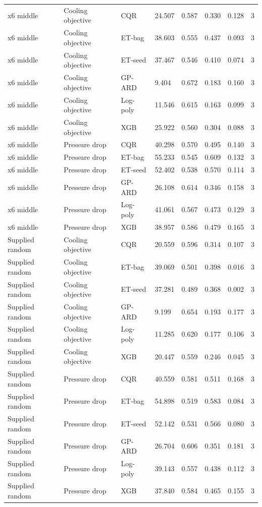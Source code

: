 \begin{longtable}{llllllll}
x6 middle & Cooling objective & CQR & 24.507 & 0.587 & 0.330 & 0.128 & 3\\
x6 middle & Cooling objective & ET-bag & 38.603 & 0.555 & 0.437 & 0.093 & 3\\
x6 middle & Cooling objective & ET-seed & 37.467 & 0.546 & 0.410 & 0.074 & 3\\
x6 middle & Cooling objective & GP-ARD & 9.404 & 0.672 & 0.183 & 0.160 & 3\\
x6 middle & Cooling objective & Log-poly & 11.546 & 0.615 & 0.163 & 0.099 & 3\\
x6 middle & Cooling objective & XGB & 25.922 & 0.560 & 0.304 & 0.088 & 3\\
x6 middle & Pressure drop & CQR & 40.298 & 0.570 & 0.495 & 0.140 & 3\\
x6 middle & Pressure drop & ET-bag & 55.233 & 0.545 & 0.609 & 0.132 & 3\\
x6 middle & Pressure drop & ET-seed & 52.402 & 0.538 & 0.570 & 0.114 & 3\\
x6 middle & Pressure drop & GP-ARD & 26.108 & 0.614 & 0.346 & 0.158 & 3\\
x6 middle & Pressure drop & Log-poly & 41.061 & 0.567 & 0.473 & 0.129 & 3\\
x6 middle & Pressure drop & XGB & 38.957 & 0.586 & 0.479 & 0.165 & 3\\
Supplied random & Cooling objective & CQR & 20.559 & 0.596 & 0.314 & 0.107 & 3\\
Supplied random & Cooling objective & ET-bag & 39.069 & 0.501 & 0.398 & 0.016 & 3\\
Supplied random & Cooling objective & ET-seed & 37.281 & 0.489 & 0.368 & 0.002 & 3\\
Supplied random & Cooling objective & GP-ARD & 9.199 & 0.654 & 0.193 & 0.177 & 3\\
Supplied random & Cooling objective & Log-poly & 11.285 & 0.620 & 0.177 & 0.106 & 3\\
Supplied random & Cooling objective & XGB & 20.447 & 0.559 & 0.246 & 0.045 & 3\\
Supplied random & Pressure drop & CQR & 40.559 & 0.581 & 0.511 & 0.168 & 3\\
Supplied random & Pressure drop & ET-bag & 54.898 & 0.519 & 0.583 & 0.084 & 3\\
Supplied random & Pressure drop & ET-seed & 52.142 & 0.531 & 0.566 & 0.080 & 3\\
Supplied random & Pressure drop & GP-ARD & 26.704 & 0.606 & 0.351 & 0.181 & 3\\
Supplied random & Pressure drop & Log-poly & 39.143 & 0.557 & 0.438 & 0.112 & 3\\
Supplied random & Pressure drop & XGB & 37.840 & 0.584 & 0.465 & 0.155 & 3\\
\bottomrule\end{longtable}\endgroup
